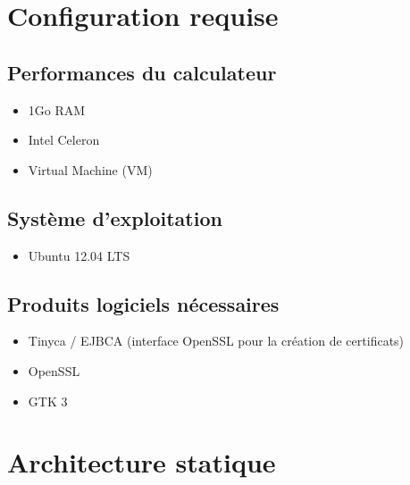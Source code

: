 \documentclass[a4paper,11pt,french]{article}
\begin{document}
\section{Configuration requise}
\vspace{0.8cm}
\subsection{Performances du calculateur}
\begin{itemize}
\item 1Go RAM 
\item Intel Celeron
\item Virtual Machine (VM)
\end{itemize}
\vspace{0.3cm}
\subsection{Système d’exploitation}
\begin{itemize}
\item Ubuntu 12.04 LTS
\end{itemize}
\vspace{0.3cm}
\subsection{Produits logiciels nécessaires}
\begin{itemize}
\item Tinyca / EJBCA (interface OpenSSL pour la création de certificats)
\item OpenSSL
\item GTK 3
\end{itemize}

\vspace{0.8cm}
\section{Architecture statique}
\vspace{0.3cm}
\end{document}
